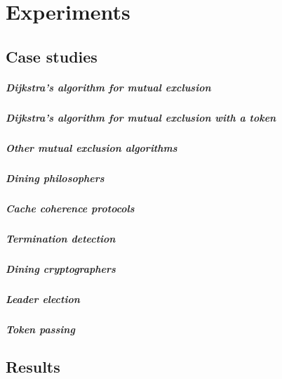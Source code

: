 \chapter{Experiments}\label{chapter:experiment}

\section{Case studies}
\paragraph{Dijkstra’s algorithm for mutual exclusion}
\paragraph{Dijkstra’s algorithm for mutual exclusion with a token}
\paragraph{Other mutual exclusion algorithms}
\paragraph{Dining philosophers}
\paragraph{Cache coherence protocols}
\paragraph{Termination detection}
\paragraph{Dining cryptographers}
\paragraph{Leader election}
\paragraph{Token passing}

\section{Results}

